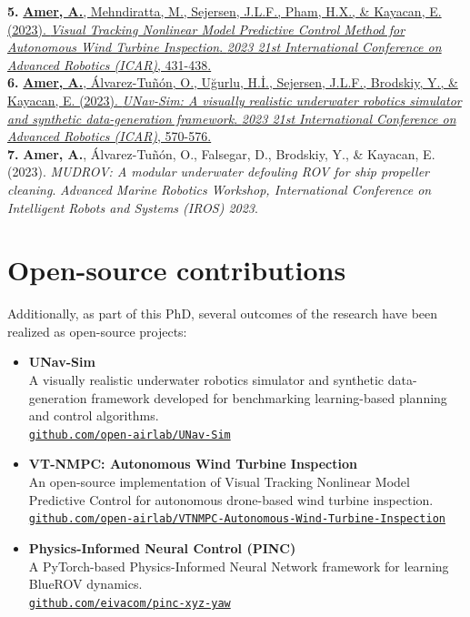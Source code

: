 \textbf{5.} \href{https://ieeexplore.ieee.org/document/10406329}{\textbf{Amer, A.}, Mehndiratta, M., Sejersen, J.L.F., Pham, H.X., \& Kayacan, E. (2023). \textit{Visual Tracking Nonlinear Model Predictive Control Method for Autonomous Wind Turbine Inspection}. \textit{2023 21st International Conference on Advanced Robotics (ICAR)}, 431-438.}\\[0.8em]

\textbf{6.} \href{https://ieeexplore.ieee.org/abstract/document/10406819}{\textbf{Amer, A.}, Álvarez-Tuñón, O., Uğurlu, H.İ., Sejersen, J.L.F., Brodskiy, Y., \& Kayacan, E. (2023). \textit{UNav-Sim: A visually realistic underwater robotics simulator and synthetic data-generation framework}. \textit{2023 21st International Conference on Advanced Robotics (ICAR)}, 570-576.}\\[0.8em]

\textbf{7.} \textbf{Amer, A.}, Álvarez-Tuñón, O., Falsegar, D., Brodskiy, Y., \& Kayacan, E. (2023). \textit{MUDROV: A modular underwater defouling ROV for ship propeller cleaning}. \textit{Advanced Marine Robotics Workshop, International Conference on Intelligent Robots and Systems (IROS) 2023}.



\section*{Open-source contributions}

Additionally, as part of this PhD, several outcomes of the research have been realized as open-source projects:



\begin{itemize}
    \item \textbf{UNav-Sim} \\
    A visually realistic underwater robotics simulator and synthetic data-generation framework developed for benchmarking learning-based planning and control algorithms.\\
    \href{https://github.com/open-airlab/UNav-Sim}{\texttt{github.com/open-airlab/UNav-Sim}}

    \item \textbf{VT-NMPC: Autonomous Wind Turbine Inspection} \\
    An open-source implementation of Visual Tracking Nonlinear Model Predictive Control for autonomous drone-based wind turbine inspection.\\
    \href{https://github.com/open-airlab/VTNMPC-Autonomous-Wind-Turbine-Inspection}{\texttt{github.com/open-airlab/VTNMPC-Autonomous-Wind-Turbine-Inspection}}

    \item \textbf{Physics-Informed Neural Control (PINC)} \\
    A PyTorch-based Physics-Informed Neural Network framework for learning BlueROV dynamics. \\
    \href{https://github.com/eivacom/pinc-xyz-yaw}{\texttt{github.com/eivacom/pinc-xyz-yaw}}
\end{itemize}





